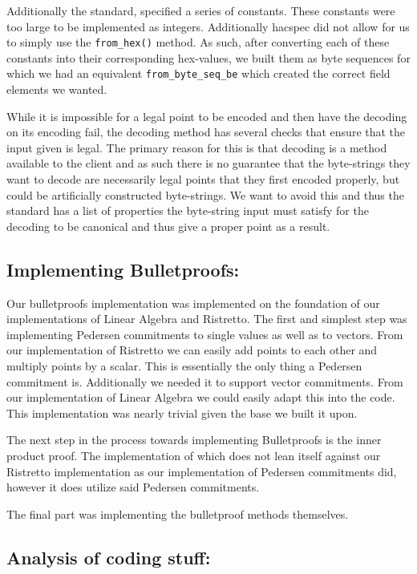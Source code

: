 \documentclass{article}
\begin{document}
Additionally the standard, specified a series of constants. These
constants were too large to be implemented as integers. Additionally
hacspec did not allow for us to simply use the \texttt{from\_hex()}
method. As such, after converting each of these constants into their
corresponding hex-values, we built them as byte sequences for which
we had an equivalent \texttt{from\_byte\_seq\_be} which created the
correct field elements we wanted.

While it is impossible for a legal point to be encoded and then have the
decoding on its encoding fail, the decoding method has several checks
that ensure that the input given is legal. The primary reason for this
is that decoding is a method available to the client and as such there is
no guarantee that the byte-strings they want to decode are necessarily
legal points that they first encoded properly, but could be artificially
constructed byte-strings. We want to avoid this and thus the standard has
a list of properties the byte-string input must satisfy for the decoding
to be canonical and thus give a proper point as a result. 

\subsection{Implementing Bulletproofs:}

Our bulletproofs implementation was implemented on the foundation of our
implementations of Linear Algebra and Ristretto. The first and simplest
step was implementing Pedersen commitments to single values as well as to
vectors. From our implementation of Ristretto we can easily add points to
each other and multiply points by a scalar. This is essentially the only
thing a Pedersen commitment is. Additionally we needed it to support
vector commitments. From our implementation of Linear Algebra we could
easily adapt this into the code. This implementation was nearly trivial
given the base we built it upon.

The next step in the process towards implementing Bulletproofs is the
inner product proof. The implementation of which does not lean itself
against our Ristretto implementation as our implementation of Pedersen
commitments did, however it does utilize said Pedersen commitments. 


The final part was implementing the bulletproof methods themselves. 

\subsection{Analysis of coding stuff:}
\end{document}

